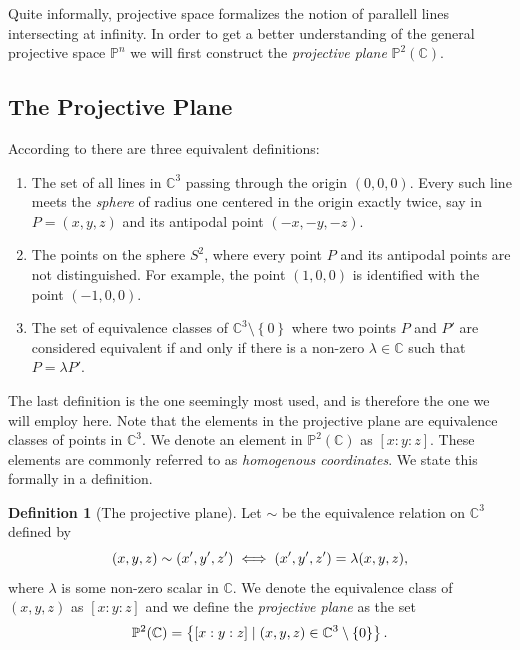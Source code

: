 \documentclass[a4paper]{article}
\theoremstyle{definition}
\newtheorem{defn}{Definition}
\theoremstyle{plain}
\newcommand{\C}{\ensuremath{\mathbb{C}}}
\newcommand{\proj}{\ensuremath{\mathbb{P}}}
\begin{document}
    Quite informally, projective space formalizes the notion of parallell lines
    intersecting at infinity. In order to get a better understanding of the
    general projective space $\proj^n$ we will first construct the
    \emph{projective plane} $\proj^2(\C)$.

    \subsection{The Projective Plane}
    \label{sub:the_projective_plane}
    
    According to \cite{Wik16} there are three equivalent definitions:
    \begin{enumerate}
        \item The set of all lines in $\C^3$ passing through the origin $(0, 0,
            0)$. Every such line meets the \emph{sphere} of radius one centered
            in the origin exactly twice, say in $P = (x, y, z)$ and its
            antipodal point $(-x, -y, -z)$.

        \item\label{item:sphere} The points on the sphere $S^2$, where every point $P$ and its
            antipodal points are not distinguished. For example, the point $(1,
            0, 0)$ is identified with the point $(-1, 0, 0)$.

        \item The set of equivalence classes of $\C^3 \setminus \left\{ 0
            \right\}$ where two points $P$ and $P'$ are considered equivalent
            if and only if there is a non-zero $\lambda \in \C$ such that $P =
            \lambda P'$.
    \end{enumerate}

    The last definition is the one seemingly most used, and is therefore the
    one we will employ here. Note that the elements in the projective plane are
    equivalence classes of points in $\C^3$. We denote an element in
    $\proj^2(\C)$ as $\left[ x : y : z \right]$. These elements are commonly
    referred to as \emph{homogenous coordinates}. We state this formally in a
    definition.

    \begin{defn}[The projective plane]
        Let $\sim$ be the equivalence relation on $\C^3$ defined by
        \begin{equation}
            \notag
            (x, y, z) \sim (x', y', z') \iff (x', y', z') = \lambda(x, y, z),
        \end{equation}
        where $\lambda$ is some non-zero scalar in $\C$. We denote the
        equivalence class of $(x, y, z)$ as $\left[ x : y : z \right]$ and we
        define the \emph{projective plane} as the set
        \begin{equation}
            \notag
            \proj^2(\C) = \left\{ \left[ x : y : z \right] \mid (x, y, z) \in
            \C^3 \setminus \left\{ 0 \right\}\right\}.
        \end{equation}
    \end{defn}
\end{document}
